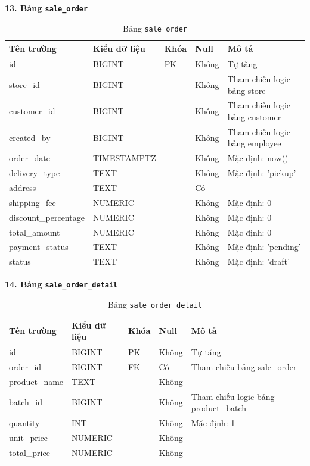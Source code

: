 \documentclass[12pt,a4paper]{report}
\begin{document}
\vspace{0.3cm}
\textbf{13. Bảng \texttt{sale\_order}}
\vspace{0.1cm}
\begin{longtable}{|>{\ttfamily}p{3.5cm}|p{2.5cm}|p{1.5cm}|p{1.5cm}|p{5cm}|}
\caption{Bảng \texttt{sale\_order}} \label{tab:db_sale_order} \\
\hline
\normalfont\textbf{Tên trường} & \textbf{Kiểu dữ liệu} & \textbf{Khóa} & \textbf{Null} & \textbf{Mô tả} \\ \hline
id & BIGINT & PK & Không & Tự tăng \\ \hline
store\_id & BIGINT & & Không & Tham chiếu logic bảng store \\ \hline
customer\_id & BIGINT & & Không & Tham chiếu logic bảng customer \\ \hline
created\_by & BIGINT & & Không & Tham chiếu logic bảng employee \\ \hline
order\_date & TIMESTAMPTZ & & Không & Mặc định: now() \\ \hline
delivery\_type & TEXT & & Không & Mặc định: 'pickup' \\ \hline
address & TEXT & & Có & \\ \hline
shipping\_fee & NUMERIC & & Không & Mặc định: 0 \\ \hline
discount\_percentage & NUMERIC & & Không & Mặc định: 0 \\ \hline
total\_amount & NUMERIC & & Không & Mặc định: 0 \\ \hline
payment\_status & TEXT & & Không & Mặc định: 'pending' \\ \hline
status & TEXT & & Không & Mặc định: 'draft' \\ \hline
\end{longtable}

\vspace{0.3cm}
\textbf{14. Bảng \texttt{sale\_order\_detail}}
\vspace{0.1cm}
\begin{longtable}{|>{\ttfamily}p{3.5cm}|p{2.5cm}|p{1.5cm}|p{1.5cm}|p{5cm}|}
\caption{Bảng \texttt{sale\_order\_detail}} \label{tab:db_sale_order_detail} \\
\hline
\normalfont\textbf{Tên trường} & \textbf{Kiểu dữ liệu} & \textbf{Khóa} & \textbf{Null} & \textbf{Mô tả} \\ \hline
id & BIGINT & PK & Không & Tự tăng \\ \hline
order\_id & BIGINT & FK & Có & Tham chiếu bảng sale\_order \\ \hline
product\_name & TEXT & & Không & \\ \hline
batch\_id & BIGINT & & Không & Tham chiếu logic bảng product\_batch \\ \hline
quantity & INT & & Không & Mặc định: 1 \\ \hline
unit\_price & NUMERIC & & Không & \\ \hline
total\_price & NUMERIC & & Không & \\ \hline
\end{longtable}
\end{document}
